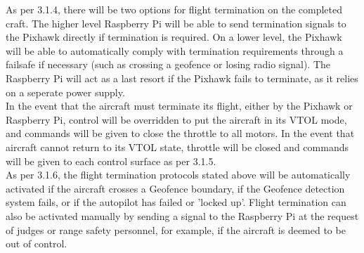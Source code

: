 
As per 3.1.4, there will be two options for flight termination on the completed craft. The higher level Raspberry Pi will be able to send termination signals to the Pixhawk directly if termination is required.  On a lower level, the Pixhawk will be able to automatically comply with termination requirements through a failsafe if necessary (such as crossing a geofence or losing radio signal). The Raspberry Pi will act as a last resort if the Pixhawk fails to terminate, as it relies on a seperate power supply.\\

In the event that the aircraft must terminate its flight, either by the Pixhawk or Raspberry Pi, control will be overridden to put the aircraft in its VTOL mode, and commands will be given to close the throttle to all motors.
In the event that aircraft cannot return to its VTOL state, throttle will be closed and commands will be given to each control surface as per 3.1.5.\\

As per 3.1.6, the flight termination protocols stated above will be automatically activated if the aircraft crosses a Geofence boundary, if the Geofence detection system fails, or if the autopilot has failed or 'locked up'. Flight termination can also be activated manually by sending a signal to the Raspberry Pi at the request of judges or range safety personnel, for example, if the aircraft is deemed to be out of control.
